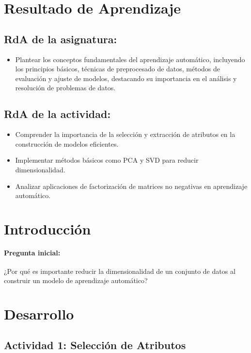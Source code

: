 \documentclass[a4,11pt]{aleph-notas}
\begin{document}
\encabezado


\section*{Resultado de Aprendizaje}

\subsection*{RdA de la asignatura:}
\begin{itemize}[leftmargin=*]
    \item Plantear los conceptos fundamentales del aprendizaje automático, incluyendo los principios básicos, técnicas de preprocesado de datos, métodos de evaluación y ajuste de modelos, destacando su importancia en el análisis y resolución de problemas de datos.
\end{itemize}

\subsection*{RdA de la actividad:}
    \begin{itemize}[leftmargin=*]
        \item Comprender la importancia de la selección y extracción de atributos en la construcción de modelos eficientes.
        \item Implementar métodos básicos como PCA y SVD para reducir dimensionalidad.
        \item Analizar aplicaciones de factorización de matrices no negativas en aprendizaje automático.
    \end{itemize}

\section*{Introducción}

\paragraph{Pregunta inicial:} 
¿Por qué es importante reducir la dimensionalidad de un conjunto de datos al construir un modelo de aprendizaje automático?


\section*{Desarrollo}

\subsection*{Actividad 1: Selección de Atributos}
\end{document}
